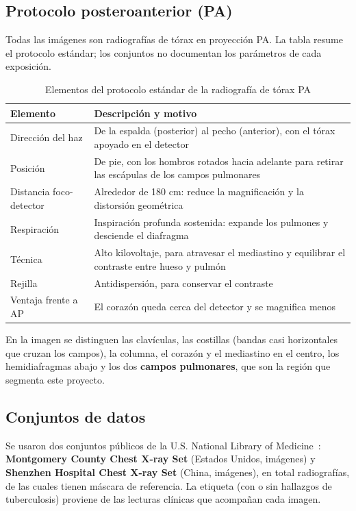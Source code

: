 \subsection{Protocolo posteroanterior (PA)}

Todas las imágenes son radiografías de tórax en proyección PA. La tabla resume el
protocolo estándar; los conjuntos no documentan los parámetros de cada exposición.

\begin{table}[H]
\centering
\small
\caption{Elementos del protocolo estándar de la radiografía de tórax PA}
\begin{tabular}{@{}p{4cm}p{9.6cm}@{}}
\toprule
\textbf{Elemento} & \textbf{Descripción y motivo} \\
\midrule
Dirección del haz & De la espalda (posterior) al pecho (anterior), con el tórax
apoyado en el detector \\
Posición & De pie, con los hombros rotados hacia adelante para retirar las
escápulas de los campos pulmonares \\
Distancia foco-detector & Alrededor de 180 cm: reduce la magnificación y la
distorsión geométrica \\
Respiración & Inspiración profunda sostenida: expande los pulmones y desciende el
diafragma \\
Técnica & Alto kilovoltaje, para atravesar el mediastino y equilibrar el contraste
entre hueso y pulmón \\
Rejilla & Antidispersión, para conservar el contraste \\
Ventaja frente a AP & El corazón queda cerca del detector y se magnifica menos \\
\bottomrule
\end{tabular}
\end{table}

En la imagen se distinguen las clavículas, las costillas (bandas casi horizontales
que cruzan los campos), la columna, el corazón y el mediastino en el centro, los
hemidiafragmas abajo y los dos \textbf{campos pulmonares}, que son la región que
segmenta este proyecto.

\subsection{Conjuntos de datos}

Se usaron dos conjuntos públicos de la U.S. National Library of
Medicine~\cite{jaeger2014}: \textbf{Montgomery County Chest X-ray Set} (Estados
Unidos, \FinNMC{} imágenes) y \textbf{Shenzhen Hospital Chest X-ray Set} (China,
\FinNSH{} imágenes), en total \FinNImagenes{} radiografías, de las cuales
\FinNConMascara{} tienen máscara de referencia. La etiqueta (con o sin hallazgos de
tuberculosis) proviene de las lecturas clínicas que acompañan cada imagen.

